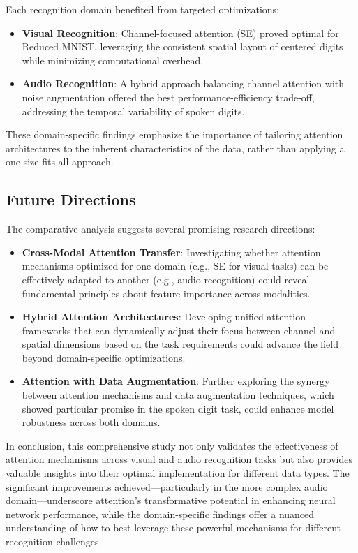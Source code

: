 \documentclass[12pt]{article}
\begin{document}
Each recognition domain benefited from targeted optimizations:

\begin{itemize}
    \item \textbf{Visual Recognition}: Channel-focused attention (SE) proved optimal for Reduced MNIST, leveraging the consistent spatial layout of centered digits while minimizing computational overhead.
    
    \item \textbf{Audio Recognition}: A hybrid approach balancing channel attention with noise augmentation offered the best performance-efficiency trade-off, addressing the temporal variability of spoken digits.\\
\end{itemize}
These domain-specific findings emphasize the importance of tailoring attention architectures to the inherent characteristics of the data, rather than applying a one-size-fits-all approach.

\subsection{Future Directions}

The comparative analysis suggests several promising research directions:

\begin{itemize}
    \item \textbf{Cross-Modal Attention Transfer}: Investigating whether attention mechanisms optimized for one domain (e.g., SE for visual tasks) can be effectively adapted to another (e.g., audio recognition) could reveal fundamental principles about feature importance across modalities.
    
    \item \textbf{Hybrid Attention Architectures}: Developing unified attention frameworks that can dynamically adjust their focus between channel and spatial dimensions based on the task requirements could advance the field beyond domain-specific optimizations.
    
    \item \textbf{Attention with Data Augmentation}: Further exploring the synergy between attention mechanisms and data augmentation techniques, which showed particular promise in the spoken digit task, could enhance model robustness across both domains.\\
\end{itemize}
In conclusion, this comprehensive study not only validates the effectiveness of attention mechanisms across visual and audio recognition tasks but also provides valuable insights into their optimal implementation for different data types. The significant improvements achieved—particularly in the more complex audio domain—underscore attention's transformative potential in enhancing neural network performance, while the domain-specific findings offer a nuanced understanding of how to best leverage these powerful mechanisms for different recognition challenges.
\end{document}
